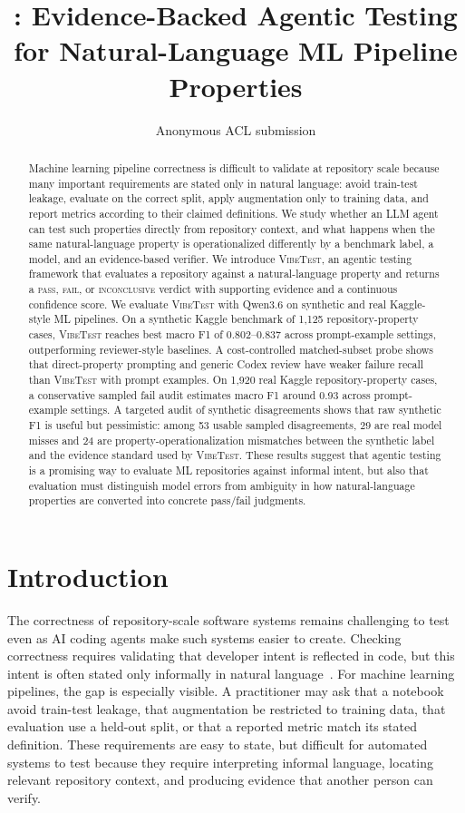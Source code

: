 \documentclass[11pt]{article}
\title{\vibetest: Evidence-Backed Agentic Testing\\for Natural-Language ML Pipeline Properties}
\author{Anonymous ACL submission}
\newcommand{\pass}{\textsc{pass}}
\newcommand{\fail}{\textsc{fail}}
\newcommand{\inconclusive}{\textsc{inconclusive}}
\newcommand{\vibetest}{\textsc{VibeTest}}
\newcommand{\qwen}{Qwen3.6}
\begin{document}
\maketitle

\begin{abstract}
Machine learning pipeline correctness is difficult to validate at repository scale because many important requirements are stated only in natural language: avoid train-test leakage, evaluate on the correct split, apply augmentation only to training data, and report metrics according to their claimed definitions.
We study whether an LLM agent can test such properties directly from repository context, and what happens when the same natural-language property is operationalized differently by a benchmark label, a model, and an evidence-based verifier.
We introduce \vibetest, an agentic testing framework that evaluates a repository against a natural-language property and returns a \pass, \fail, or \inconclusive{} verdict with supporting evidence and a continuous confidence score.
We evaluate \vibetest{} with \qwen{} on synthetic and real Kaggle-style ML pipelines.
On a synthetic Kaggle benchmark of 1,125 repository-property cases, \vibetest{} reaches best macro F1 of 0.802--0.837 across prompt-example settings, outperforming reviewer-style baselines.
A cost-controlled matched-subset probe shows that direct-property prompting and generic Codex review have weaker failure recall than \vibetest{} with prompt examples.
On 1,920 real Kaggle repository-property cases, a conservative sampled fail audit estimates macro F1 around 0.93 across prompt-example settings.
A targeted audit of synthetic disagreements shows that raw synthetic F1 is useful but pessimistic: among 53 usable sampled disagreements, 29 are real model misses and 24 are property-operationalization mismatches between the synthetic label and the evidence standard used by \vibetest.
These results suggest that agentic testing is a promising way to evaluate ML repositories against informal intent, but also that evaluation must distinguish model errors from ambiguity in how natural-language properties are converted into concrete pass/fail judgments.
\end{abstract}

\section{Introduction}

The correctness of repository-scale software systems remains challenging to test even as AI coding agents make such systems easier to create.
Checking correctness requires validating that developer intent is reflected in code, but this intent is often stated only informally in natural language~\citep{zeller2009why}.
For machine learning pipelines, the gap is especially visible.
A practitioner may ask that a notebook avoid train-test leakage, that augmentation be restricted to training data, that evaluation use a held-out split, or that a reported metric match its stated definition.
These requirements are easy to state, but difficult for automated systems to test because they require interpreting informal language, locating relevant repository context, and producing evidence that another person can verify.
\end{document}
